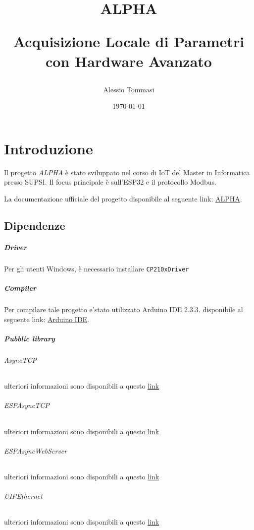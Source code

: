 \documentclass[12pt,a4paper]{report}
\begin{document}
\title{\textbf{ALPHA} 

Acquisizione Locale di Parametri con Hardware Avanzato
}
\author{Alessio Tommasi}
\date{\today}

\maketitle

\tableofcontents

\centering
\chapter{Introduzione}

Il progetto \textit{ALPHA} è stato sviluppato nel corso di IoT del Master in Informatica presso SUPSI. Il focus principale è sull'ESP32 e il protocollo Modbus.

La documentazione ufficiale del progetto disponibile al seguente link: \href{https://progettistudio.supsi.ch/dettaglio.php?p=C10936}{ALPHA}.
\section{Dipendenze}

\paragraph{Driver}
Per gli utenti Windows, è necessario installare \texttt{CP210xDriver}
\paragraph{Compiler}
Per compilare tale progetto e'stato utilizzato Arduino IDE 2.3.3.
disponibile al seguente link: \href{https://www.arduino.cc/en/software}{Arduino IDE}.

\paragraph{Pubblic library}

\subparagraph[short]{AsyncTCP} ulteriori informazioni sono disponibili a questo  \href{https://github.com/dvarrel/AsyncTCP}{link}
\subparagraph[short]{ESPAsyncTCP} ulteriori informazioni sono disponibili a questo  \href{https://github.com/dvarrel/ESPAsyncTCP}{link}
\subparagraph[short]{ESPAsyncWebServer} ulteriori informazioni sono disponibili a questo  \href{https://github.com/dvarrel/ESPAsyncWebSrv}{link}
\subparagraph[short]{UIPEthernet} ulteriori informazioni sono disponibili a questo  \href{https://github.com/UIPEthernet/UIPEthernet}{link}
\end{document}
